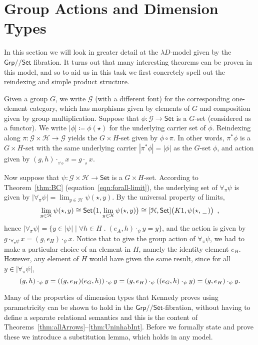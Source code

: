 \documentclass[a4paper,UKenglish]{lipics}
\theoremstyle{plain}
\newcommand{\msf}[1]{\mathsf{#1}} %
\newcommand{\Grp}{\msf{Grp}}
\newcommand{\Set}{\msf{Set}}
\newcommand{\blank}{\, \underline{\hspace{2mm}} \,}
\newcommand{\act}[1]{\cdot_{_{#1}}}
\newcommand{\GroupSet}[1]{[#1,\Set]}
\newcommand{\Lslice}[1]{#1/\!/\Set}
\newcommand{\GrpSet}{\Lslice{\Grp}}
\newcommand{\bbracket}[1]{\bigl( #1 \bigr)}
\begin{document}
\section{Group Actions and Dimension Types}\label{sec:MonSet}

In this section we will look in greater detail at the $\lambda
D$-model given by the $\GrpSet$ fibration. It turns out that many interesting theorems can be proven in this model, and so to aid us in this task we first concretely spell out the
reindexing and simple product structure.

Given a group $G$, we write $\mathcal{G}$ (with a different font) for the corresponding one-element category, which has morphisms given by elements of $G$ and composition given by group multiplication. Suppose that $\phi: \mathcal{G} \rightarrow \Set$ is a $G$-set
(considered as a functor). We write $|\phi| \coloneqq
\phi(\star)$ for the underlying carrier set of $\phi$.  Reindexing
along $\pi : \mathcal{G} \times \mathcal{H} \rightarrow \mathcal{G}$ yields the $G \times H$-set
given by $\phi \circ \pi$. In other words, $\pi^\ast\phi$ is a $G
\times H$-set with the same underlying carrier $|\pi^{\ast}\phi| =
|\phi|$ as the $G$-set $\phi$, and action given by $(g,h)
\act{\pi^{\ast}\phi} x = g \act{\phi} x$.

Now suppose that $\psi : \mathcal{G} \times \mathcal{H} \rightarrow\Set $ is a $G \times
H$-set. According to Theorem~\ref{thm:BC}
(equation~\eqref{eqn:forall-limit}), the underlying set of $\forall
_\pi \psi$ is given by $|\forall _\pi \psi| = \lim_{y\in \mathcal{H}}
\psi (\star, y)$. By the universal property of limits,
\[
 \lim_{y\in \mathcal{H}} \psi (\star, y) \cong \Set \bbracket{1, \lim_{y\in \mathcal{H}} \psi (\star, y)} \cong \GroupSet{\mathcal{H}}\bbracket{K1, \psi (\star, \blank)} \enspace \text,
\]
hence  $|\forall_\pi \psi | = \{y \in |\psi| \mathrel | \forall h\in H\;.\; (e_A, h) \cdot_{\psi} y = y \}$, and the action is given by $g \cdot_{\forall_\pi \psi} x = (g, e_H) \cdot_{\psi} x$.
%
Notice that to give the group action of $\forall_\pi \psi$, we had to
make a particular choice of an element in $H$, namely the identity
element $e_H$. However, any element of $H$ would have given the same
result, since for all $y \in |\forall_\pi \psi |$,
\[
   (g, h) \cdot_{\psi} y
 = ((g, e_H)(e_G, h)) \cdot_{\psi} y
 = (g, e_H) \cdot_{\psi} ((e_G, h) \cdot_{\psi} y)
 = (g, e_H) \cdot_{\psi} y
\text.\]

Many of the properties of dimension types that Kennedy proves using
parametricity can be shown to hold in the $\GrpSet$-fibration, without
having to define a separate relational semantics and this is the content of Theorems~\ref{thm:allArrows}--\ref{thm:UninhabInt}. Before we formally state and prove these we introduce a substitution lemma, which holds in any model.
\end{document}

